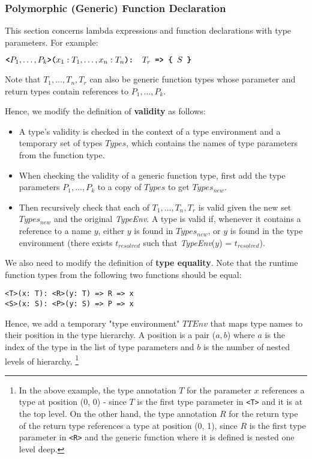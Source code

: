 \subsubsection*{Polymorphic (Generic) Function Declaration}
\label{generics1}

This section concerns lambda expressions and function declarations with type parameters.
For example:

\begin{center}
    $\textbf{\texttt{<}} P_1, \dots, P_k \textbf{\texttt{>(}} x_1: T_1, \dots, x_n: T_n \textbf{\texttt{): }} T_r \textbf{\texttt{ => \{ }} S \textbf{\texttt{ \} }}  $
\end{center}

Note that $T_1, \dots, T_n, T_r$ can also be generic function types whose parameter and return types contain references to $P_1, \dots, P_k$.

Hence, we modify the definition of \textbf{validity} as follows:
\begin{itemize}
    \item A type's validity is checked in the context of a type environment and a temporary set of types $Types$, which contains the names of type parameters from the function type.
    \item When checking the validity of a generic function type, first add the type parameters $P_1, \dots, P_k$ to a copy of $Types$ to get $Types_{new}$. 
    \item Then recursively check that each of $T_1, \dots, T_n, T_r$ is valid given the new set $Types_{new}$ and the original \textit{TypeEnv}. A type is valid if, whenever it contains a reference to a name $y$, either $y$ is found in $Types_{new}$, or $y$ is found in the type environment (there exists $t_{resolved}$ such that \textit{TypeEnv}($y$) = $t_{resolved}$).
\end{itemize}

We also need to modify the definition of \textbf{type equality}. Note that the runtime function types from the following two functions should be equal:

\begin{center}
    \verb|<T>(x: T): <R>(y: T) => R => x| \\
    \verb|<S>(x: S): <P>(y: S) => P => x|
\end{center}

Hence, we add a temporary "type environment" $TTEnv$ that maps type names to their position in the type hierarchy. 
A position is a pair ($a, b$) where $a$ is the index of the type in the list of type parameters and $b$ is the number of nested levels of hierarchy.
\footnote{In the above example, the type annotation $T$ for the parameter $x$ references a type at position (0, 0) - since $T$ is the first type parameter in \texttt{<T>} and it is at the top level. 
On the other hand, the type annotation $R$ for the return type of the return type references a type at position (0, 1), since $R$ is the first type parameter in \texttt{<R>} and the generic function where it is defined is nested one level deep.}

